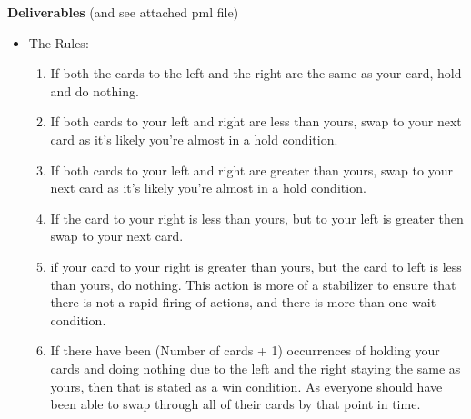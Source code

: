 \documentclass[a4paper,portrait,12pt]{article}
\begin{document}
\begin{center}
	\textbf{Deliverables} (and see attached pml file)
	\begin{itemize}
		\item The Rules:
		\begin{enumerate}
			\item If both the cards to the left and the right are the same as your card, hold and do nothing.
			\item If both cards to your left and right are less than yours, swap to your next card as it's likely you're almost in a hold condition.
			\item If both cards to your left and right are greater than yours, swap to your next card as it's likely you're almost in a hold condition.
			\item If the card to your right is less than yours, but to your left is greater then swap to your next card.
			\item if your card to your right is greater than yours, but the card to left is less than yours, do nothing.  This action is more of a stabilizer to ensure that there is not a rapid firing of actions, and there is more than one wait condition.
			\item If there have been (Number of cards + 1) occurrences of holding your cards and doing nothing due to the left and the right staying the same as yours, then that is stated as a win condition.  As everyone should have been able to swap through all of their cards by that point in time.
		\end{enumerate}
	

\end{itemize}
\end{center}
\end{document}
